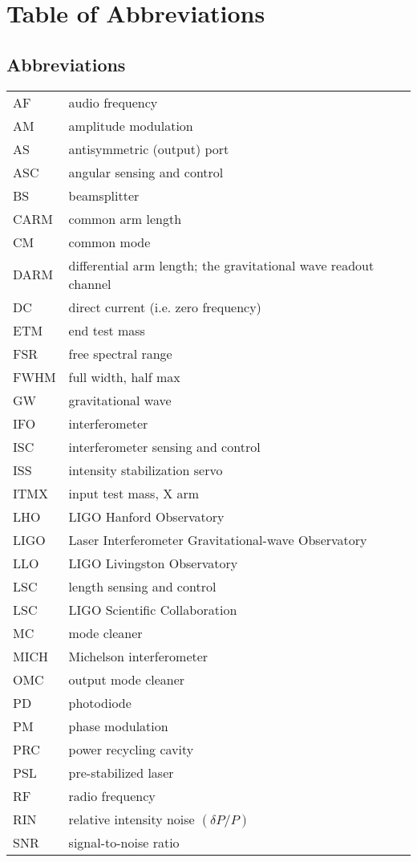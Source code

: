 \chapter{Table of Abbreviations}
\label{chapter6}
\section{Abbreviations}
\singlespacing
\begin{tabular}{|l|l|}
\hline 
AF   & audio frequency \\
AM   & amplitude modulation \\
AS   & antisymmetric (output) port \\
ASC  & angular sensing and control \\
BS   & beamsplitter \\
CARM & common arm length \\
CM   & common mode \\
DARM & differential arm length; the gravitational wave readout channel \\
DC   & direct current (i.e. zero frequency) \\
ETM  & end test mass \\
FSR  & free spectral range \\
FWHM & full width, half max \\
GW   & gravitational wave \\
IFO  & interferometer \\
ISC  & interferometer sensing and control \\
ISS  & intensity stabilization servo \\
ITMX & input test mass, X arm \\
LHO  & LIGO Hanford Observatory \\
LIGO & Laser Interferometer Gravitational-wave Observatory \\
LLO  & LIGO Livingston Observatory \\
LSC  & length sensing and control \\
LSC  & LIGO Scientific Collaboration \\
MC   & mode cleaner \\
MICH & Michelson interferometer \\
OMC  & output mode cleaner \\
PD   & photodiode \\
PM   & phase modulation \\
PRC  & power recycling cavity \\
PSL  & pre-stabilized laser \\
RF   & radio frequency \\
RIN  & relative intensity noise $(\delta P/P)$ \\
SNR  & signal-to-noise ratio \\
\hline
\end{tabular}

